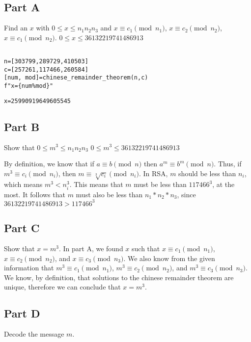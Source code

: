 \documentclass[11pt]{article}
\begin{document}
\subsection{Part A}
\label{sec:orga7fa5cd}
Find an \(x\) with \(0\le x\le n_{1}n_{2}n_{3}\) and \(x\equiv c_{1}\pmod{n_1}\), \(x\equiv c_{2}\pmod{n_2}\), \(x\equiv c_{1}\pmod{n_2}\).
\(0\le x\le 36132219741486913\)

\begin{verbatim}

n=[303799,289729,410503]
c=[257261,117466,260584]
[num, mod]=chinese_remainder_theorem(n,c)
f"x={num%mod}"

\end{verbatim}

\begin{verbatim}
x=25990919649605545
\end{verbatim}

\subsection{Part B}
\label{sec:orgf52e13f}
Show that \(0\le m^{3}\le n_1n_2n_3\)
\(0\le m^3\le 36132219741486913\)

By definition, we know that if \(a\equiv b\pmod{n}\) then \(a^m\equiv b^m\pmod{n}\).
Thus, if \(m^3\equiv c_i\pmod{n_i}\), then \(m\equiv \sqrt[3]{c_i}\pmod{n_i}\).
In RSA, \(m\) should be less than \(n_i\), which means \(m^3< n_i^3\).
This means that \(m\) must be less than \(117466^3\), at the most.
It follows that \(m\) must also be less than \(n_1*n_2*n_3\), since \(36132219741486913>117466^3\)

\subsection{Part C}
\label{sec:org8f667a5}
Show that \(x=m^3\).
In part A, we found \(x\) such that \(x\equiv c_1\pmod{n_1}\), \(x\equiv c_2\pmod{n_2}\), and \(x\equiv c_3\pmod{n_3}\).
We also know from the given information that \(m^3\equiv c_1\pmod{n_1}\), \(m^3\equiv c_2\pmod{n_2}\), and \(m^3\equiv c_3\pmod{n_3}\).
We know, by definition, that solutions to the chinese remainder theorem are unique, therefore we can conclude that \(x=m^3\).

\subsection{Part D}
\label{sec:org579a558}
Decode the message \(m\).
\end{document}
